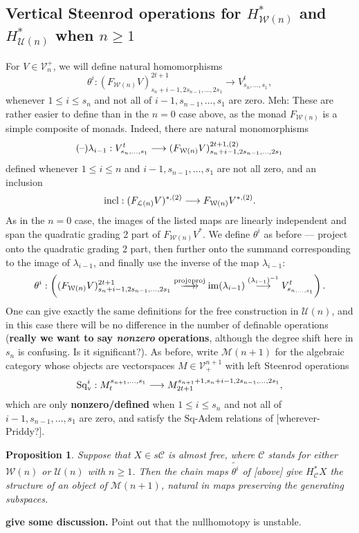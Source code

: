 \documentclass[11pt]{amsart}
\theoremstyle{plain}
\newtheorem{prop}[thm]{Proposition}
\theoremstyle{definition}
\DeclareMathOperator{\im}{im}
\newcommand{\DASH}{\textup{--}}
\renewcommand{\to}{\longrightarrow}
\newcommand{\calW}{\mathcal{W}}
\newcommand{\calU}{\mathcal{U}}
\newcommand{\calL}{\mathcal{L}}
\newcommand{\calC}{\mathcal{C}}
\newcommand{\calV}{\mathcal{V}}
\newcommand{\calM}{\mathcal{M}}
\theoremstyle{plain}
\newcommand{\vect}[2]{\calV^{#1}_{#2}}
\newcommand{\Sq}{\mathrm{Sq}}
\begin{document}
\begin{Cohomology operations for all unstable Lie algebras}
\subsection{Vertical Steenrod operations for $H^*_{\calW(n)}$ and $H^*_{\calU(n)}$ when $n\geq1$}\label{section: vertical Koszul operations n positive}
For $V\in \vect{+}{n}$, we will define natural homomorphisms
\[\theta^i:(F_{\calW(n)}V)^{2t+1}_{s_n+i-1,2s_{n-1},\ldots,2s_1}\to V^{t}_{s_n,\ldots,s_1},\]
whenever $1\leq i \leq s_n$ and not all of $i-1,s_{n-1},\ldots,s_1$ are zero.
{\tiny Meh: These are rather easier to define than in the $n=0$ case above, as the monad $F_{\calW(n)}$ is a simple composite of monads.}
Indeed, there are natural monomorphisms
\[(\DASH)\lambda_{i-1}:V^{t}_{s_n,\ldots,s_1}\to (F_{\calW(n)}V)^{2t+1,(2)}_{s_n+i-1,2s_{n-1},\ldots,2s_1}\]
defined whenever $1\leq i\leq n$ and $i-1,s_{n-1},\ldots,s_1$ are not all zero, and an inclusion
\[\textup{incl}:(F_{\calL(n)}V)^{*,(2)}\to F_{\calW(n)}V^{*,(2)}.\]
As in the $n=0$ case, the images of the listed maps are linearly independent and span the quadratic grading 2 part of $F_{\calW(n)}V^*$. We define $\theta^i$ as before --- project onto the quadratic grading 2 part, then further onto the summand corresponding to the image of $\lambda_{i-1}$, and finally use the inverse of the map $\lambda_{i-1}$:
\[\theta^i:\left((F_{\calW(n)}V)^{2t+1}_{s_n+i-1,2s_{n-1},\ldots,2s_1}\overset{\textup{proj}\circ\textup{proj}}{\makebox[.06ex][l]{$\to$}\to} \im (\lambda_{i-1})\overset{(\lambda_{i-1})^{-1}}{\to}V^{t}_{s_{n,\ldots,s_1}}\right).\]
One can give exactly the same definitions for the free construction in $\calU(n)$, and in this case there will be no difference in the number of definable operations (\textbf{really we want to say \emph{nonzero} operations}, although the degree shift here in $s_n$ is confusing. Is it significant?). 
As before, write $\calM(n+1)$ for the algebraic category whose objects are vectorspaces $M\in\vect{n+1}{+}$ with left Steenrod operations
\[\Sq_\textup{v}^i:M^{s_{n+1},\ldots,s_1}_t\to M^{s_{n+1}+1,s_n+i-1,2s_{n-1},\ldots,2s_1}_{2t+1},\]
which are only \textbf{nonzero/defined} when $1\leq i \leq s_n$ and not all of $i-1,s_{n-1},\ldots,s_1$ are zero, and
satisfy the $\Sq$-Adem relations of [wherever-Priddy?].
\begin{prop}\label{vertical steenrod operations prop}
Suppose that $X\in s\calC$ is almost free, where $\calC$ stands for either $\calW(n)$ or $\calU(n)$ with $n\geq1$. Then the chain maps $\widetilde{\theta^i}$ of [above] give $H^*_{\calC}X$ the structure of an object of $\calM(n+1)$, natural in maps preserving the generating subspaces.
\end{prop}
\textbf{give some discussion.} Point out that the nullhomotopy is unstable.


\end{Cohomology operations for all unstable Lie algebras}
\end{document}
